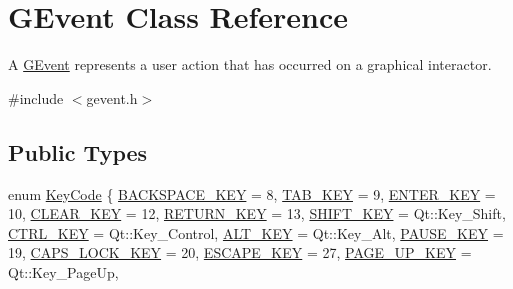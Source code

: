 \hypertarget{classGEvent}{}\section{G\+Event Class Reference}
\label{classGEvent}


A \mbox{\hyperlink{classGEvent}{G\+Event}} represents a user action that has occurred on a graphical interactor.  




{\ttfamily \#include $<$gevent.\+h$>$}

\subsection*{Public Types}
\begin{DoxyCompactItemize}
\item 
enum \mbox{\hyperlink{classGEvent_a7885f47644a0388f981f416fa20389b2}{Key\+Code}} \{ \newline
\mbox{\hyperlink{classGEvent_a7885f47644a0388f981f416fa20389b2a4dd1e53528965cb26b7ef9dc9cca8485}{B\+A\+C\+K\+S\+P\+A\+C\+E\+\_\+\+K\+EY}} = 8, 
\mbox{\hyperlink{classGEvent_a7885f47644a0388f981f416fa20389b2ad538ab9675c9668313689f95378a4b55}{T\+A\+B\+\_\+\+K\+EY}} = 9, 
\mbox{\hyperlink{classGEvent_a7885f47644a0388f981f416fa20389b2a3e386e3874767e9b60555335164772ff}{E\+N\+T\+E\+R\+\_\+\+K\+EY}} = 10, 
\mbox{\hyperlink{classGEvent_a7885f47644a0388f981f416fa20389b2a02e6a96abb0a5969b840025a87a67637}{C\+L\+E\+A\+R\+\_\+\+K\+EY}} = 12, 
\mbox{\hyperlink{classGEvent_a7885f47644a0388f981f416fa20389b2af5ac08fefce6ee222239468bdfd9e828}{R\+E\+T\+U\+R\+N\+\_\+\+K\+EY}} = 13, 
\mbox{\hyperlink{classGEvent_a7885f47644a0388f981f416fa20389b2a2bbaf2a7978d88e9522825aa6f145265}{S\+H\+I\+F\+T\+\_\+\+K\+EY}} = Qt\+:\+:Key\+\_\+\+Shift, 
\mbox{\hyperlink{classGEvent_a7885f47644a0388f981f416fa20389b2a050f925d6eb111283fda69cfbf604c33}{C\+T\+R\+L\+\_\+\+K\+EY}} = Qt\+:\+:Key\+\_\+\+Control, 
\mbox{\hyperlink{classGEvent_a7885f47644a0388f981f416fa20389b2a01fa85cb918fb185760ebd24531be258}{A\+L\+T\+\_\+\+K\+EY}} = Qt\+:\+:Key\+\_\+\+Alt, 
\mbox{\hyperlink{classGEvent_a7885f47644a0388f981f416fa20389b2a6a27d19c37941821112decd8a2c301d6}{P\+A\+U\+S\+E\+\_\+\+K\+EY}} = 19, 
\mbox{\hyperlink{classGEvent_a7885f47644a0388f981f416fa20389b2a9ea9cefc98302c5ea58a366bbe13ab91}{C\+A\+P\+S\+\_\+\+L\+O\+C\+K\+\_\+\+K\+EY}} = 20, 
\mbox{\hyperlink{classGEvent_a7885f47644a0388f981f416fa20389b2ad710e81a592eb9cdec0c237c1efdc027}{E\+S\+C\+A\+P\+E\+\_\+\+K\+EY}} = 27, 
\mbox{\hyperlink{classGEvent_a7885f47644a0388f981f416fa20389b2a303b1e3e75da2aebf9cbaf4dfa833d5e}{P\+A\+G\+E\+\_\+\+U\+P\+\_\+\+K\+EY}} = Qt\+:\+:Key\+\_\+\+Page\+Up, 

\end{DoxyCompactItemize}
